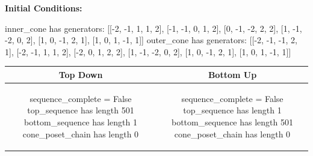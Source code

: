 \documentclass[10pt]{article}
\begin{document}
\textbf{Initial Conditions:}
\begin{SAGE}
inner_cone has generators: 
[[-2, -1, 1, 1, 2], [-1, -1, 0, 1, 2], [0, -1, -2, 2, 2], [1, -1, -2, 0, 2], [1, 0, -1, 2, 1], [1, 0, 1, -1, 1]]
outer_cone has generators: 
[[-2, -1, -1, 2, 1], [-2, -1, 1, 1, 2], [-2, 0, 1, 2, 2], [1, -1, -2, 0, 2], [1, 0, -1, 2, 1], [1, 0, 1, -1, 1]]

\end{SAGE}
\begin{tabular}{c|c}
\textbf{Top Down} & \textbf{Bottom Up} \\ \hline  
\begin{SAGE}
sequence_complete = False
top_sequence has length 501
bottom_sequence has length 1
cone_poset_chain has length 0
\end{SAGE} 
&
\begin{SAGE}
sequence_complete = False
top_sequence has length 1
bottom_sequence has length 501
cone_poset_chain has length 0
\end{SAGE} 
\\ \hline


\end{tabular}
\end{document}
